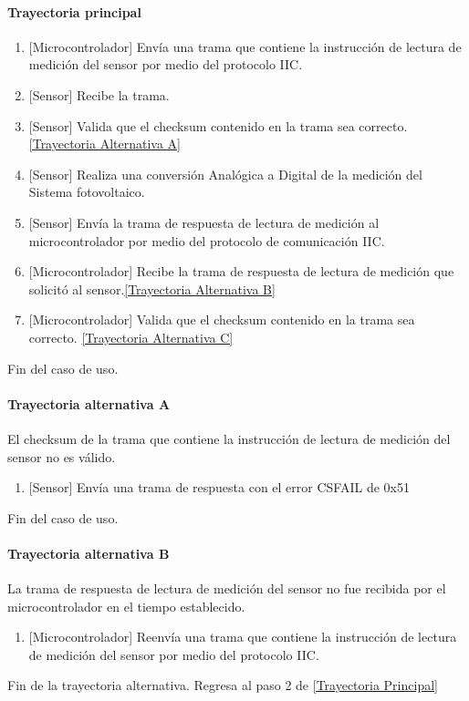 \paragraph{Trayectoria principal}
\label{SUB-M-CU1.3:TP}
	\begin{enumerate}
	    \item {[Microcontrolador]} Envía una trama que contiene la instrucción de lectura de medición del sensor por medio del protocolo IIC.
	    \item {[Sensor]} Recibe la trama.
	    \item {[Sensor]} Valida que el checksum contenido en la trama sea correcto. \hyperref[SUB-M-CU1.3:TA]{[Trayectoria Alternativa A]} %
		\item {[Sensor]} Realiza una conversión Analógica a Digital de la medición del Sistema fotovoltaico. 
		\item {[Sensor]} Envía la trama de respuesta de lectura de medición al microcontrolador por medio del protocolo de comunicación IIC.
		\item {[Microcontrolador]} Recibe la trama de respuesta de lectura de medición que solicitó al sensor.\hyperref[SUB-M-CU1.3:TB]{[Trayectoria Alternativa B]} %
		\item {[Microcontrolador]} Valida que el checksum contenido en la trama sea correcto. \hyperref[SUB-M-CU1.3:TC]{[Trayectoria Alternativa C]}%
	\end{enumerate}
	Fin del caso de uso.

\paragraph{Trayectoria alternativa A} \label{SUB-M-CU1.3:TA}
	El checksum de la trama que contiene la instrucción de lectura de medición del sensor no es válido.
	\begin{enumerate}[label=A\arabic*.]
		\item {[Sensor]} Envía una trama de respuesta con el error CSFAIL de 0x51  
	\end{enumerate}
	Fin del caso de uso.

\paragraph{Trayectoria alternativa B} \label{SUB-M-CU1.3:TB}
	La trama de respuesta de lectura de medición del sensor no fue recibida por el microcontrolador en el tiempo establecido.
	\begin{enumerate}[label=B\arabic*.]
		\item {[Microcontrolador]} Reenvía una trama que contiene la instrucción de lectura de medición del sensor por medio del protocolo IIC.  
	\end{enumerate}
	Fin de la trayectoria alternativa. Regresa al paso 2 de \hyperref[SUB-M-CU1.3:TP]{[Trayectoria Principal]}  
	
